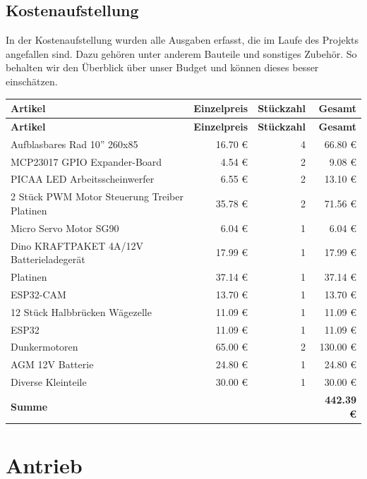 \documentclass[ngerman,12pt,a4paper]{article}
\begin{document}
		\subsection{Kostenaufstellung} %
		In der Kostenaufstellung wurden alle Ausgaben erfasst, die im Laufe des Projekts angefallen sind. Dazu gehören unter anderem Bauteile und sonstiges Zubehör. So behalten wir den Überblick über unser Budget und können dieses besser einschätzen.
			\begin{center}
				\begin{longtable}{| p{8.2cm} | r | r | r |}
					\hline
					\textbf{Artikel} & \textbf{Einzelpreis} & \textbf{Stückzahl} & \textbf{Gesamt} \\
					\hline
					\endfirsthead
					\hline
					\textbf{Artikel} & \textbf{Einzelpreis} & \textbf{Stückzahl} & \textbf{Gesamt} \\
					\hline
					\endhead
					\hline
					Aufblasbares Rad 10'' 260x85  & 16.70 € & 4 & 66.80 € \\ \hline
					MCP23017 GPIO Expander-Board & 4.54 € & 2 & 9.08 € \\ \hline
					PICAA LED Arbeitsscheinwerfer & 6.55 € & 2 & 13.10 € \\ \hline
					2 Stück PWM Motor Steuerung Treiber Platinen & 35.78 € & 2 & 71.56 € \\ \hline
					Micro Servo Motor SG90 & 6.04 € & 1 & 6.04 € \\ \hline
					Dino KRAFTPAKET 4A/12V Batterieladegerät & 17.99 € & 1 & 17.99 € \\ \hline
					Platinen & 37.14 € & 1 & 37.14 € \\ \hline
					ESP32-CAM & 13.70 € & 1 & 13.70 € \\ \hline
					12 Stück Halbbrücken Wägezelle & 11.09 € & 1 & 11.09 € \\ \hline
					ESP32 & 11.09 € & 1 & 11.09 € \\ \hline
					Dunkermotoren & 65.00 € & 2 & 130.00 € \\ \hline
					AGM 12V Batterie & 24.80 € & 1 & 24.80 € \\ \hline
					Diverse Kleinteile & 30.00 € & 1 & 30.00 € \\ \hline
					\textbf{Summe} & & & \textbf{442.39 €} \\
					\hline
				\end{longtable}
			\end{center}
			\newpage
	\section{Antrieb}
	
\end{document}
